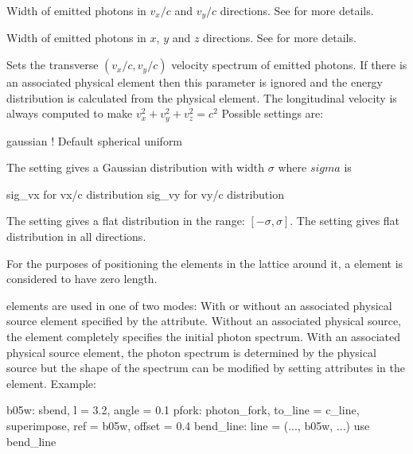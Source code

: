 {\begin{description}
  \item[\vn{sig_vx, sig_vy}] \Newline
Width of emitted photons in $v_x/c$ and $v_y/c$ directions. See
 for more details.

  \item[\vn{sig_x, sig_y, sig_z}] \Newline
Width of emitted photons in $x$, $y$ and $z$ directions. See
 for more details.

  \item[\vn{velocity_distribution}] \Newline
Sets the transverse $(v_x/c, v_y/c)$ velocity spectrum of emitted
photons. If there is an associated physical element then this
parameter is ignored and the energy distribution is calculated from
the physical element. The longitudinal velocity is always computed to
make $v_x^2 + v_y^2 + v_z^2 = c^2$ Possible settings are:
\begin{example2}
  gaussian    ! Default
  spherical
  uniform
\end{example2}
The  setting gives a Gaussian distribution with width
$\sigma$ where $sigma$ is 
\begin{example2}
  sig_vx     for vx/c distribution
  sig_vy     for vy/c distribution
\end{example2}
The  setting gives a flat distribution in the range:
$[-\sigma, \sigma]$.
The  setting gives flat distribution in all directions.
  \end{description}

For the purposes of positioning the elements in the lattice around it,
a  element is considered to have zero length.

 elements are used in one of two modes: With or
without an associated physical source element specified by the
 attribute. Without an associated physical source,
the  element completely specifies the initial photon
spectrum. With an associated physical source element, the photon
spectrum is determined by the physical source but the shape of the
spectrum can be modified by setting attributes in the 
element. Example:
\begin{example}
  b05w: sbend, l = 3.2, angle = 0.1
  pfork: photon_fork, to_line = c_line, superimpose, ref = b05w, offset = 0.4
  bend_line: line = (..., b05w, ...)
  use bend_line


\end{example}}
